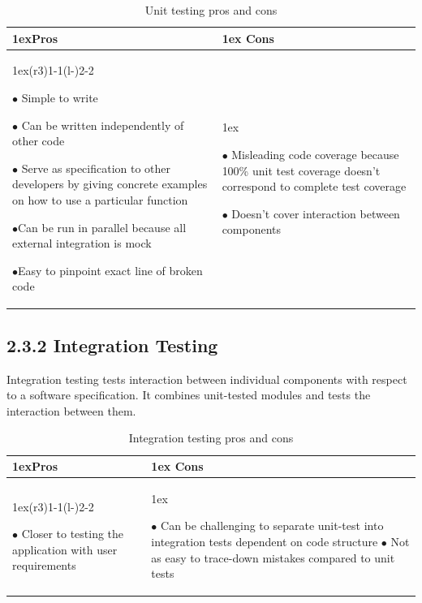 \documentclass[12pt]{report}
\begin{document}
\begin{table}[ht]
\begin{tabularx}{\linewidth}{>{\parskip1ex}X@{\kern4\tabcolsep}>{\parskip1ex}X}
\toprule
\hfil\bfseries Pros & \hfil\bfseries Cons
\\\cmidrule(r{3\tabcolsep}){1-1}\cmidrule(l{-\tabcolsep}){2-2}

$\bullet$ Simple to write\par
$\bullet$ Can be written independently of other code\par
$\bullet$ Serve as specification to other developers by giving concrete examples on how to use a particular function\par
$\bullet$Can be run in parallel because all external integration is mock\par
$\bullet$Easy to pinpoint exact line of broken code\par

&

$\bullet$ Misleading code coverage because 100\% unit test coverage doesn't correspond to complete test coverage \par
$\bullet$ Doesn't cover interaction between components \par

\\\bottomrule
\end{tabularx}
\caption{Unit testing pros and cons}
\end{table}
\vspace{-10pt}
\subsection*{2.3.2 Integration Testing}
\par\noindent
Integration testing tests interaction between individual components with respect to a software specification. It combines unit-tested modules and tests the interaction between them.

\begin{table}[ht]
\begin{tabularx}{\linewidth}{>{\parskip1ex}X@{\kern4\tabcolsep}>{\parskip1ex}X}
\toprule
\hfil\bfseries Pros & \hfil\bfseries Cons
\\\cmidrule(r{3\tabcolsep}){1-1}\cmidrule(l{-\tabcolsep}){2-2}

$\bullet$ Closer to testing the application with user requirements 

&

$\bullet$ Can be challenging to separate unit-test into integration tests    dependent on code structure
$\bullet$ Not as easy to trace-down mistakes compared to unit tests

\\\bottomrule
\end{tabularx}
\caption{Integration testing pros and cons}
\end{table}
\end{document}
